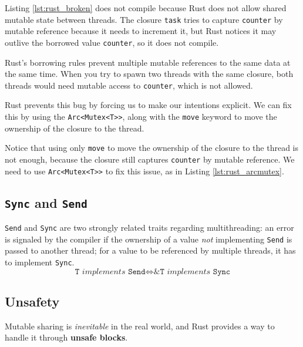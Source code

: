 Listing \ref{lst:rust_broken} does not compile because Rust does not allow shared mutable state between threads. 
The closure \lstinline|task| tries to capture \lstinline|counter| by mutable reference because it needs to increment it, but Rust notices it may outlive the borrowed value \lstinline|counter|, so it does not compile.

Rust’s borrowing rules prevent multiple mutable references to the same data at the same time. When you try to spawn two threads with the same closure, both threads would need mutable access to \lstinline|counter|, which is not allowed.

Rust prevents this bug by forcing us to make our intentions explicit. We can fix this by using the \lstinline|Arc<Mutex<T>>|, along with the \lstinline|move| keyword to move the ownership of the closure to the thread.

Notice that using only \lstinline|move| to move the ownership of the closure to the thread is not enough, because the closure still captures \lstinline|counter| by mutable reference. We need to use \lstinline|Arc<Mutex<T>>| to fix this issue, as in Listing \ref{lst:rust_arcmutex}.

\subsection{\texttt{Sync} and \texttt{Send}}
\lstinline|Send| and \lstinline|Sync| are two strongly related traits regarding multithreading: 
an error is signaled by the compiler if the ownership of
a value \textit{not} implementing \lstinline|Send| is passed to another thread;
for a value to be referenced by multiple threads, it has to
implement \lstinline|Sync|.
\begin{equation}
   \texttt{T} \textit{ implements } \texttt{Send} \Leftrightarrow \texttt{\&T} \textit{ implements } \texttt{Sync}
\end{equation}

\subsection{Unsafety}
Mutable sharing is \textit{inevitable} in the real world, and Rust provides a way to handle it through \textbf{unsafe blocks}.

